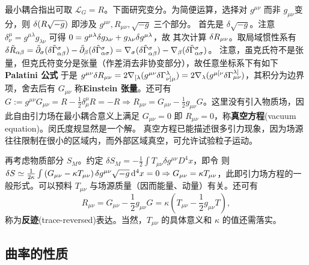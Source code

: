 最小耦合指出可取 $\mathcal L_G=R$。下面研究变分。为简便运算，选择对 $g^{\mu\nu}$ 而非 $g_{\mu\nu}$变分，则 $\var(R\sqrt{-g})$ 即涉及 $g^{\mu\nu},R_{\mu\nu},\sqrt{-g}$ 三个部分。
首先是 $\delta\sqrt{-g}$。注意 $\delta^{\mu}_{\nu}=g^{\mu\lambda}g_{\lambda\nu}$ 可得 $0=g^{\mu\lambda}\var g_{\lambda\nu}+g_{\lambda\nu}\var g^{\mu\lambda}$，故
其次计算 $\var R_{\mu\nu}$。取局域惯性系有 $\delta\tilde R_{\alpha\beta} = \tilde{\partial}_\sigma(\delta\tilde\Gamma^\sigma_{\alpha\beta})-\tilde{\partial}_\beta(\delta\tilde \Gamma^\sigma_{\alpha\sigma}) = \nabla_\sigma(\delta\tilde\Gamma^\sigma_{\alpha\beta})-\nabla_\beta(\delta\tilde \Gamma^\sigma_{\alpha\sigma})$。
注意，虽克氏符不是张量，但克氏符变分是张量（作差消去非协变部分），故任意坐标系下有如下\textbf{Palatini 公式}
于是 $g^{\mu\nu}\var R_{\mu\nu}=2 \nabla_{[\lambda}( g^{\mu\nu} \delta \Gamma_{\nu]\mu}^\lambda) =2\nabla_\lambda(g^{\mu [\nu} \delta \Gamma_{\mu \nu}^{\lambda]})$，其积分为边界项，舍去后有
$G_{\mu\nu}$ 称\textbf{Einstein 张量}。还可有 $G:=g^{\mu\nu}G_{\mu\nu}=R-\frac{1}{2}\delta^\mu_\mu R=-R\Rightarrow R_{\mu\nu}=G_{\mu\nu}-\frac 12 g_{\mu\nu} G$。这里没有引入物质场，因此自由引力场在最小耦合意义上满足 $G_{\mu\nu}=0$ 即 $R_{\mu\nu}=0$，称\textbf{真空方程}(vacuum equation)。闵氏度规显然是一个解。
真空方程已能描述很多引力现象，因为场源往往限制在很小的区域内，而外部区域真空，可允许试验粒子运动。

再考虑物质部分 $S_M$。约定 $\delta S_M =-\frac{1}{2} \int T_{\mu \nu} \delta g^{\mu \nu} D^4{x}$，即令
则 $\var S\simeq\frac{1}{2\kappa}\int\left(G_{\mu\nu}-\kappa T_{\mu\nu}\right)\var g^{\mu\nu}\sqrt{-g}\dd[4]{x}=0\Rightarrow G_{\mu\nu}=\kappa T_{\mu\nu}$，此即引力场方程的一般形式。可以预料 $T_{\mu\nu}$ 与场源质量（因而能量、动量）有关。还可有
\[ 
R_{\mu\nu}=G_{\mu\nu}-\frac 12 g_{\mu\nu} G=\kappa\left(T_{\mu\nu}-\frac12 g_{\mu\nu}T\right),
\]
称为\textbf{反迹}(trace-reversed)表达。当然，$T_{\mu\nu}$ 的具体意义和 $\kappa$ 的值还需落实。

\subsection{曲率的性质}

